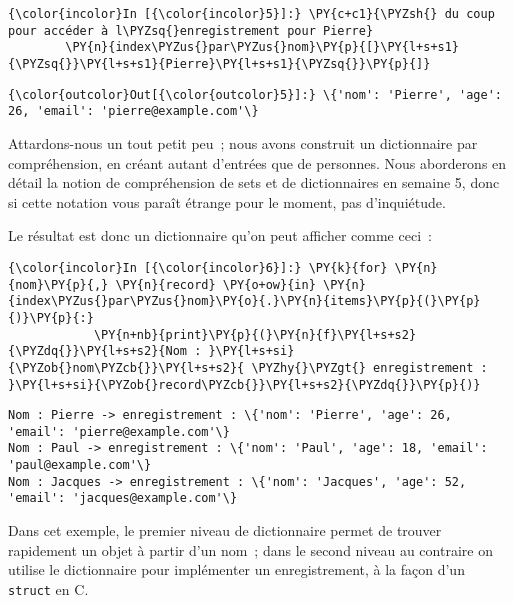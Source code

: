     \begin{Verbatim}[commandchars=\\\{\}]
{\color{incolor}In [{\color{incolor}5}]:} \PY{c+c1}{\PYZsh{} du coup pour accéder à l\PYZsq{}enregistrement pour Pierre}
        \PY{n}{index\PYZus{}par\PYZus{}nom}\PY{p}{[}\PY{l+s+s1}{\PYZsq{}}\PY{l+s+s1}{Pierre}\PY{l+s+s1}{\PYZsq{}}\PY{p}{]}
\end{Verbatim}


\begin{Verbatim}[commandchars=\\\{\}]
{\color{outcolor}Out[{\color{outcolor}5}]:} \{'nom': 'Pierre', 'age': 26, 'email': 'pierre@example.com'\}
\end{Verbatim}
            
    Attardons-nous un tout petit peu~; nous avons construit un dictionnaire
par compréhension, en créant autant d'entrées que de personnes. Nous
aborderons en détail la notion de compréhension de sets et de
dictionnaires en semaine 5, donc si cette notation vous paraît étrange
pour le moment, pas d'inquiétude.

Le résultat est donc un dictionnaire qu'on peut afficher comme ceci~:

    \begin{Verbatim}[commandchars=\\\{\}]
{\color{incolor}In [{\color{incolor}6}]:} \PY{k}{for} \PY{n}{nom}\PY{p}{,} \PY{n}{record} \PY{o+ow}{in} \PY{n}{index\PYZus{}par\PYZus{}nom}\PY{o}{.}\PY{n}{items}\PY{p}{(}\PY{p}{)}\PY{p}{:}
            \PY{n+nb}{print}\PY{p}{(}\PY{n}{f}\PY{l+s+s2}{\PYZdq{}}\PY{l+s+s2}{Nom : }\PY{l+s+si}{\PYZob{}nom\PYZcb{}}\PY{l+s+s2}{ \PYZhy{}\PYZgt{} enregistrement : }\PY{l+s+si}{\PYZob{}record\PYZcb{}}\PY{l+s+s2}{\PYZdq{}}\PY{p}{)}
\end{Verbatim}


    \begin{Verbatim}[commandchars=\\\{\}]
Nom : Pierre -> enregistrement : \{'nom': 'Pierre', 'age': 26, 'email': 'pierre@example.com'\}
Nom : Paul -> enregistrement : \{'nom': 'Paul', 'age': 18, 'email': 'paul@example.com'\}
Nom : Jacques -> enregistrement : \{'nom': 'Jacques', 'age': 52, 'email': 'jacques@example.com'\}

    \end{Verbatim}

    Dans cet exemple, le premier niveau de dictionnaire permet de trouver
rapidement un objet à partir d'un nom~; dans le second niveau au
contraire on utilise le dictionnaire pour implémenter un enregistrement,
à la façon d'un \texttt{struct} en C.

